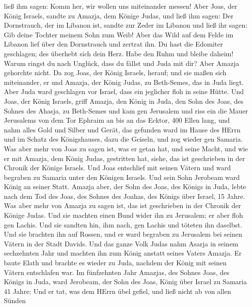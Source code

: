 ließ ihm sagen: Komm her, wir wollen uns miteinander messen!
 Aber Joas, der König Israels, sandte zu Amazja, dem Könige
Judas, und ließ ihm sagen: Der Dornstrauch, der im Libanon ist, sandte
zur Zeder im Libanon und ließ ihr sagen: Gib deine Tochter meinem Sohn
zum Weib! Aber das Wild auf dem Felde im Libanon lief über den
Dornstrauch und zertrat ihn.  Du hast die Edomiter
geschlagen; des überhebt sich dein Herz. Habe den Ruhm und bleibe
daheim! Warum ringst du nach Unglück, dass du fällst und Juda mit dir?
 Aber Amazja gehorchte nicht. Da zog Joas, der König
Israels, herauf; und sie maßen sich miteinander, er und Amazja, der
König Judas, zu Beth-Semes, das in Juda liegt.  Aber Juda
ward geschlagen vor Israel, dass ein jeglicher floh in seine Hütte.
 Und Joas, der König Israels, griff Amazja, den König in
Juda, den Sohn des Joas, des Sohnes des Ahasja, zu Beth-Semes und kam
gen Jerusalem und riss ein die Mauer Jerusalems von dem Tor Ephraim an
bis an das Ecktor, 400 Ellen lang,  und nahm alles Gold und
Silber und Gerät, das gefunden ward im Hause des HErrn und im Schatz des
Königshauses, dazu die Geiseln, und zog wieder gen Samaria.
 Was aber mehr von Joas zu sagen ist, was er getan hat, und
seine Macht, und wie er mit Amazja, dem König Judas, gestritten hat,
siehe, das ist geschrieben in der Chronik der Könige Israels.
 Und Joas entschlief mit seinen Vätern und ward begraben zu
Samaria unter den Königen Israels. Und sein Sohn Jerobeam ward König an
seiner Statt.  Amazja aber, der Sohn des Joas, des Königs
in Juda, lebte nach dem Tod des Joas, des Sohnes des Joahas, des Königs
über Israel, 15 Jahre.  Was aber mehr von Amazja zu sagen
ist, das ist geschrieben in der Chronik der Könige Judas. 
Und sie machten einen Bund wider ihn zu Jerusalem; er aber floh gen
Lachis. Und sie sandten hin, ihm nach, gen Lachis und töteten ihn
daselbst.  Und sie brachten ihn auf Rossen, und er ward
begraben zu Jerusalem bei seinen Vätern in der Stadt Davids.
 Und das ganze Volk Judas nahm Asarja in seinem sechzehnten
Jahr und machten ihn zum König anstatt seines Vaters Amazja.
 Er baute Elath und brachte es wieder zu Juda, nachdem der
König mit seinen Vätern entschlafen war.  Im fünfzehnten
Jahr Amazjas, des Sohnes Joas, des Königs in Juda, ward Jerobeam, der
Sohn des Joas, König über Israel zu Samaria 41 Jahre;  Und
er tat, was dem HErrn übel gefiel, und ließ nicht ab von allen Sünden
